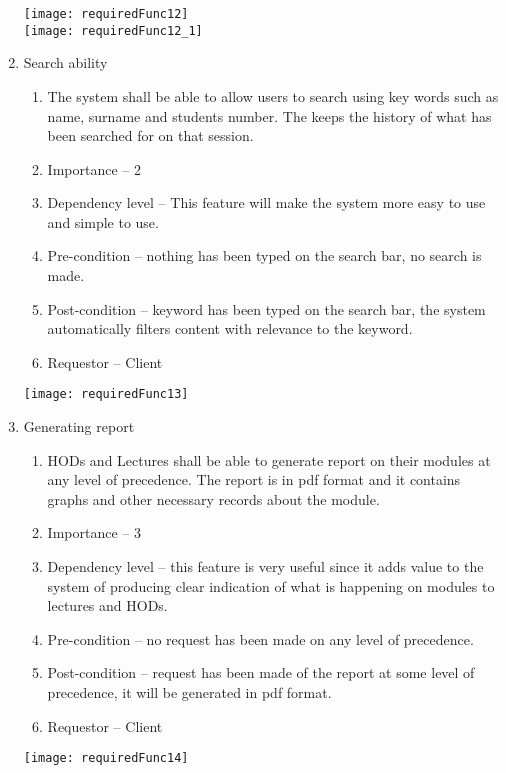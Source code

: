 \documentclass[12pt, a4paper]{scrartcl}
\begin{document}
\begin{enumerate}
\begin{enumerate}
					\end{enumerate}
					\texttt{[image: requiredFunc12]}\\
					\texttt{[image: requiredFunc12\_1]}
					\item Search ability
					\begin{enumerate}
					\item The system shall be able to allow users to search using key words such as name, surname and students number. The keeps the history of what has been searched for on that session.
					\item Importance – 2
					\item Dependency level – This feature will make the system more easy to use and simple to use.
					\item Pre-condition – nothing has been typed on the search bar, no search is made.
					\item Post-condition – keyword has been typed on the search bar, the system automatically filters content with relevance to the keyword.
					\item Requestor – Client
					\end{enumerate}
					\texttt{[image: requiredFunc13]}
					\item Generating report
					\begin{enumerate}
					\item HODs and Lectures shall be able to generate report on their modules at any level of precedence. The report is in pdf format and it contains graphs and other necessary records about the module.
					\item Importance – 3
					\item Dependency level – this feature is very useful since it adds value to the system of producing clear indication of what is happening on modules to lectures and HODs.
					\item Pre-condition – no request has been made on any level of precedence.
					\item Post-condition – request has been made of the report at some level of precedence, it will be generated in pdf format.
					\item Requestor – Client
					\end{enumerate}
					\texttt{[image: requiredFunc14]}
				\end{enumerate}
			\pagebreak
\end{document}
